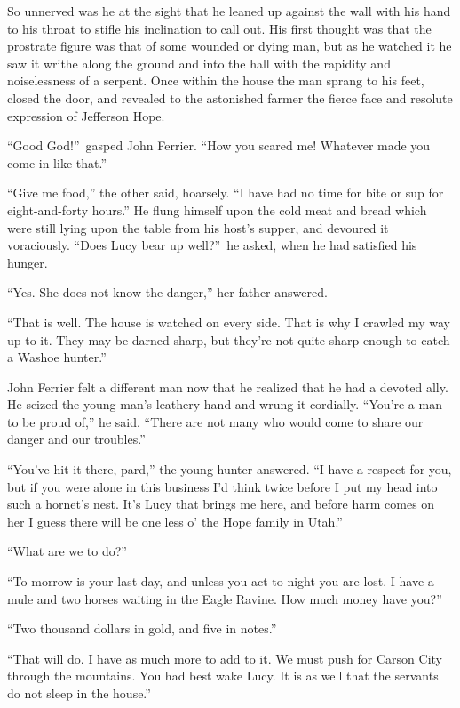 \documentclass[12pt,english]{book}
\begin{document}
So unnerved was he at the sight that he leaned up against the wall
with his hand to his throat to stifle his inclination to call out.
His first thought was that the prostrate figure was that of some wounded
or dying man, but as he watched it he saw it writhe along the ground
and into the hall with the rapidity and noiselessness of a serpent.
Once within the house the man sprang to his feet, closed the door,
and revealed to the astonished farmer the fierce face and resolute
expression of Jefferson Hope.

{}``Good God!''\ gasped John Ferrier. {}``How you scared me! Whatever
made you come in like that.''

{}``Give me food,'' the other said, hoarsely. {}``I have had no
time for bite or sup for eight-and-forty hours.'' He flung himself
upon the cold meat and bread which were still lying upon the table
from his host's supper, and devoured it voraciously. {}``Does Lucy
bear up well?''\ he asked, when he had satisfied his hunger.

{}``Yes. She does not know the danger,'' her father answered.

{}``That is well. The house is watched on every side. That is why
I crawled my way up to it. They may be darned sharp, but they're not
quite sharp enough to catch a Washoe hunter.''

John Ferrier felt a different man now that he realized that he had
a devoted ally. He seized the young man's leathery hand and wrung
it cordially. {}``You're a man to be proud of,'' he said. {}``There
are not many who would come to share our danger and our troubles.''

{}``You've hit it there, pard,'' the young hunter answered. {}``I
have a respect for you, but if you were alone in this business I'd
think twice before I put my head into such a hornet's nest. It's Lucy
that brings me here, and before harm comes on her I guess there will
be one less o' the Hope family in Utah.''

{}``What are we to do?''

{}``To-morrow is your last day, and unless you act to-night you are
lost. I have a mule and two horses waiting in the Eagle Ravine. How
much money have you?''

{}``Two thousand dollars in gold, and five in notes.''

{}``That will do. I have as much more to add to it. We must push
for Carson City through the mountains. You had best wake Lucy. It
is as well that the servants do not sleep in the house.''
\end{document}
